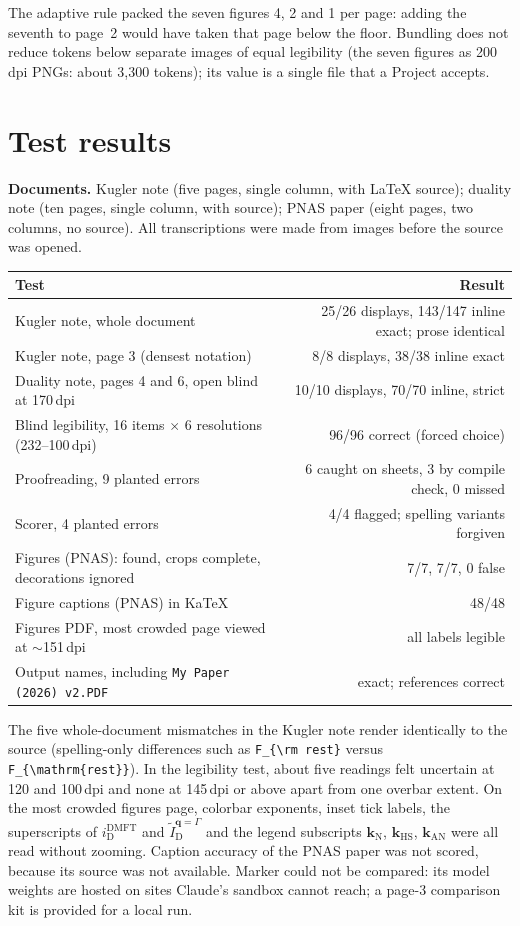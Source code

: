 \documentclass[11pt]{article}
\begin{document}
The adaptive rule packed the seven figures 4, 2 and 1 per page: adding the
seventh to page~2 would have taken that page below the floor. Bundling does not
reduce tokens below separate images of equal legibility (the seven figures as
200\,dpi PNGs: about 3{,}300 tokens); its value is a single file that a Project
accepts.

\section{Test results}
\label{sec:tests}

\textbf{Documents.} Kugler note (five pages, single column, with LaTeX source);
duality note (ten pages, single column, with source); PNAS paper (eight pages,
two columns, no source). All transcriptions were made from images before the
source was opened.

\begin{tabularx}{\linewidth}{@{}Lr@{}}
\toprule
Test & Result \\
\midrule
Kugler note, whole document & 25/26 displays, 143/147 inline exact; prose identical \\
Kugler note, page 3 (densest notation) & 8/8 displays, 38/38 inline exact \\
Duality note, pages 4 and 6, open blind at 170\,dpi & 10/10 displays, 70/70 inline, strict \\
Blind legibility, 16 items $\times$ 6 resolutions (232--100\,dpi) & 96/96 correct (forced choice) \\
Proofreading, 9 planted errors & 6 caught on sheets, 3 by compile check, 0 missed \\
Scorer, 4 planted errors & 4/4 flagged; spelling variants forgiven \\
Figures (PNAS): found, crops complete, decorations ignored & 7/7, 7/7, 0 false \\
Figure captions (PNAS) in KaTeX & 48/48 \\
Figures PDF, most crowded page viewed at $\sim$151\,dpi & all labels legible \\
Output names, including \texttt{My Paper (2026) v2.PDF} & exact; references correct \\
\bottomrule
\end{tabularx}

The five whole-document mismatches in the Kugler note render identically to the
source (spelling-only differences such as \verb|F_{\rm rest}| versus
\verb|F_{\mathrm{rest}}|). In the legibility test, about five readings felt
uncertain at 120 and 100\,dpi and none at 145\,dpi or above apart from one
overbar extent. On the most crowded figures page, colorbar exponents, inset tick
labels, the superscripts of $i_{\mathrm D}^{\mathrm{DMFT}}$ and
$\tilde I_{\mathrm D}^{\mathbf q=\Gamma}$ and the legend subscripts
$\mathbf k_{\mathrm N}$, $\mathbf k_{\mathrm{HS}}$, $\mathbf k_{\mathrm{AN}}$ were
all read without zooming. Caption accuracy of the PNAS paper was not scored,
because its source was not available. Marker could not be compared: its model
weights are hosted on sites Claude's sandbox cannot reach; a page-3 comparison
kit is provided for a local run.
\end{document}
